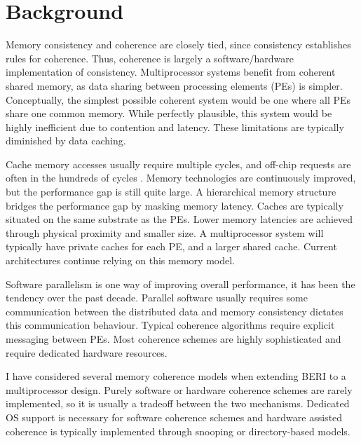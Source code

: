 \makeatletter
\makeatother
\ifpdf
\graphicspath{{Background/BackgroundFigs/PNG/}{Background/BackgroundFigs/PDF/}{Background/BackgroundFigs/}}
\else
\graphicspath{{Background/BackgroundFigs/EPS/}{Background/BackgroundFigs/}}
\fi

\chapter{Background}
	\label{chapter_background}
	
	Memory consistency and coherence are closely tied, since consistency establishes rules for coherence. Thus, coherence is largely a software/hardware implementation of consistency. Multiprocessor systems benefit from coherent shared memory, as data sharing between processing elements (PEs) is simpler. Conceptually, the simplest possible coherent system would be one where all PEs share one common memory. While perfectly plausible, this system would be highly inefficient due to contention and latency. These limitations are typically diminished by data caching.
	
	Cache memory accesses usually require multiple cycles, and off-chip requests are often in the hundreds of cycles \cite{Hennessy06}. Memory technologies are continuously improved, but the performance gap is still quite large. A hierarchical memory structure bridges the performance gap by masking memory latency. Caches are typically situated on the same substrate as the PEs. Lower memory latencies are achieved through physical proximity and smaller size. A multiprocessor system will typically have private caches for each PE, and a larger shared cache. Current architectures continue relying on this memory model. 
	
	Software parallelism is one way of improving overall performance, it has been the tendency over the past decade. Parallel software usually requires some communication between the distributed data and memory consistency dictates this communication behaviour. Typical coherence algorithms require explicit messaging between PEs. Most coherence schemes are highly sophisticated and require dedicated hardware resources.

	I have considered several memory coherence models when extending BERI to a multiprocessor design.
	Purely software or hardware coherence schemes are rarely implemented, so it is usually a tradeoff between the two mechanisms. Dedicated OS support is necessary for software coherence schemes and hardware assisted coherence is typically implemented through snooping or directory-based models. 
	

